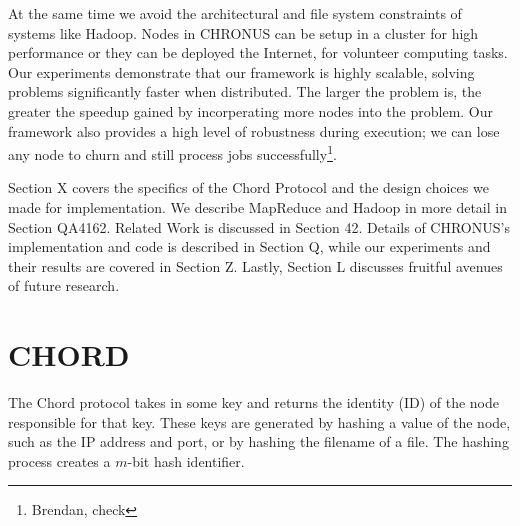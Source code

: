 \documentclass[conference, compsocconf, letterpaper]{IEEEtran}
\begin{document}
At the same time we avoid the architectural and file system constraints of systems like Hadoop.  Nodes in CHRONUS can be setup in a cluster for high performance or they can be deployed the Internet, for volunteer computing tasks.  Our experiments demonstrate that our framework is highly scalable, solving problems significantly faster when distributed.  The larger the problem is, the greater the speedup gained by incorperating more nodes into the problem.  Our framework also provides a high level of robustness during execution;  we can lose any node to churn and still process jobs successfully\footnote{Brendan, check}.


Section X covers the specifics of the Chord Protocol and the design choices we made for implementation. We describe MapReduce and Hadoop in more detail in Section QA4162.  Related Work is discussed in Section 42. Details of CHRONUS's implementation and code is described in Section Q, while our experiments and their results are covered in Section Z.  Lastly, Section L discusses fruitful avenues of future research.







\section{CHORD}
The Chord protocol \cite{Chord} takes in some key and returns the identity (ID) of the node responsible for that key.  These keys are generated by hashing a value of the node, such as the IP address and port, or by hashing the filename of a file.  The hashing process creates a $m$-bit hash identifier.
\end{document}

